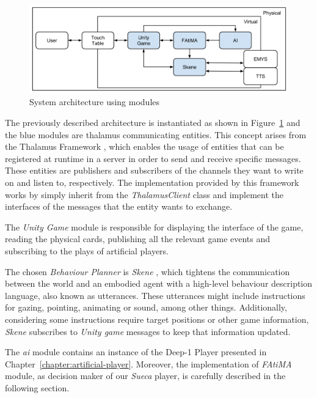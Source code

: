 \begin{figure}[ht]
  \centering
    \includegraphics[width=1\textwidth]{./img/6/model}
  \caption{System architecture using modules}
\label{fig:model}
\end{figure}

The previously described architecture is instantiated as shown in Figure~\ref{fig:model} and the blue modules are thalamus communicating entities.
This concept arises from the Thalamus Framework \cite{Ribeiro}, which enables the usage of entities that can be registered at runtime in a server in order to send and receive specific messages.
These entities are publishers and subscribers of the channels they want to write on and listen to, respectively.
The implementation provided by this framework works by simply inherit from the \emph{ThalamusClient} class and implement the interfaces of the messages that the entity wants to exchange.

The \emph{Unity Game} module is responsible for displaying the interface of the game, reading the physical cards, publishing all the relevant game events and subscribing to the plays of artificial players.

The chosen \emph{Behaviour Planner} is \emph{Skene} \cite{Ribeiroa}, which tightens the communication between the world and an embodied agent with a high-level behaviour description language, also known as utterances.
These utterances might include instructions for gazing, pointing, animating or sound, among other things.
Additionally, considering some instructions require target positions or other game information, \emph{Skene} subscribes to \emph{Unity game} messages to keep that information updated.

The \emph{\ac{ai}} module contains an instance of the Deep-1 Player presented in Chapter~\ref{chapter:artificial-player}.
Moreover, the implementation of \emph{FAtiMA} module, as decision maker of our \emph{Sueca} player, is carefully described in the following section.
